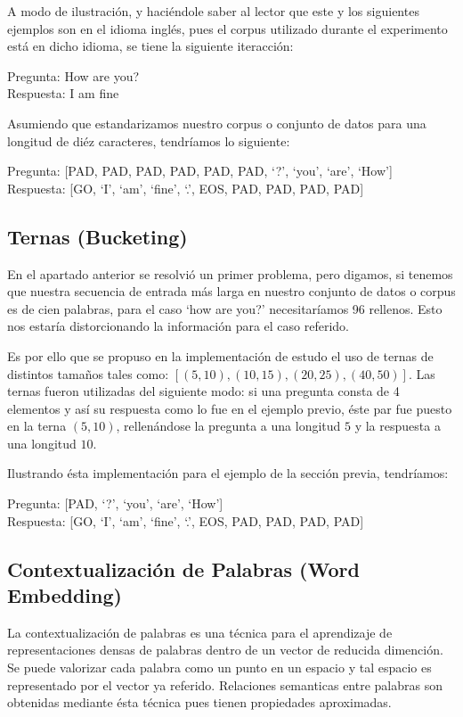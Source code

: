 \documentclass[12pt, letterpaper]{article}
\begin{document}
    A modo de ilustración, y haciéndole saber al lector que este y los siguientes ejemplos son en el idioma inglés, pues el corpus utilizado durante el experimento está en dicho idioma, se tiene la siguiente iteracción:

    Pregunta: How are you? \\
    Respuesta: I am fine

    Asumiendo que estandarizamos nuestro corpus o conjunto de datos para una longitud de diéz caracteres, tendríamos lo siguiente:

    Pregunta: [PAD, PAD, PAD, PAD, PAD, PAD, `?', `you', `are', `How'] \\
    Respuesta: [GO, `I', `am', `fine', `.', EOS, PAD, PAD, PAD, PAD]

    \subsection{Ternas (Bucketing)}
    En el apartado anterior se resolvió un primer problema, pero digamos, si tenemos que nuestra secuencia de entrada más larga en nuestro conjunto de datos o corpus es de cien palabras, para el caso `how are you?' necesitaríamos 96 rellenos. Esto nos estaría distorcionando la información para el caso referido.

    Es por ello que se propuso en la implementación de estudo el uso de ternas de distintos tamaños tales como: $[(5,10), (10,15), (20,25), (40,50)]$. Las ternas fueron utilizadas del siguiente modo: si una pregunta consta de 4 elementos y así su respuesta como lo fue en el ejemplo previo, éste par fue puesto en la terna  $(5,10)$, rellenándose la pregunta a una longitud $5$ y la respuesta a una longitud $10$.

    Ilustrando ésta implementación para el ejemplo de la sección previa, tendríamos:

    Pregunta: [PAD, `?', `you', `are', `How']\\
    Respuesta: [GO, `I', `am', `fine', `.', EOS, PAD, PAD, PAD, PAD]

    \subsection{Contextualización de Palabras (Word Embedding)}

    La contextualización de palabras es una técnica para el aprendizaje de representaciones densas de palabras dentro de un vector de reducida dimención. Se puede valorizar cada palabra como un punto en un espacio y tal espacio es representado por el vector ya referido. Relaciones semanticas entre palabras son obtenidas mediante ésta técnica pues tienen propiedades aproximadas.
\end{document}

